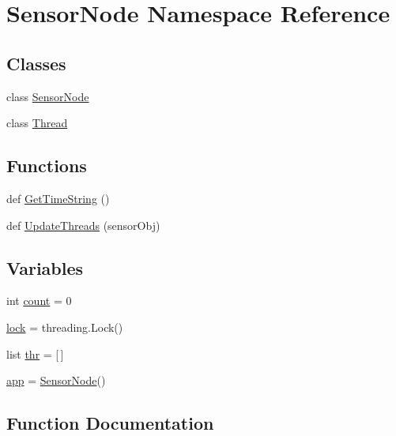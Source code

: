 \hypertarget{namespaceSensorNode}{}\section{Sensor\+Node Namespace Reference}
\label{namespaceSensorNode}
\subsection*{Classes}
\begin{DoxyCompactItemize}
\item 
class \hyperlink{classSensorNode_1_1SensorNode}{Sensor\+Node}
\item 
class \hyperlink{classSensorNode_1_1Thread}{Thread}
\end{DoxyCompactItemize}
\subsection*{Functions}
\begin{DoxyCompactItemize}
\item 
def \hyperlink{namespaceSensorNode_a9ef694aa75e06b802a3ad5f0ef476f6f}{Get\+Time\+String} ()
\item 
def \hyperlink{namespaceSensorNode_a12355791e34f3144948a5a6f35a3b2b5}{Update\+Threads} (sensor\+Obj)
\end{DoxyCompactItemize}
\subsection*{Variables}
\begin{DoxyCompactItemize}
\item 
int \hyperlink{namespaceSensorNode_a3016284326d74dfe31b9e2ecfa7fa6df}{count} = 0
\item 
\hyperlink{namespaceSensorNode_a07847a51e8fc73f94d1b5244eabe2926}{lock} = threading.\+Lock()
\item 
list \hyperlink{namespaceSensorNode_a972db98176c0c5ca50407768608addd0}{thr} = \mbox{[}$\,$\mbox{]}
\item 
\hyperlink{namespaceSensorNode_a1c06b14e3f48f507247d5b8e0e910f35}{app} = \hyperlink{classSensorNode_1_1SensorNode}{Sensor\+Node}()
\end{DoxyCompactItemize}


\subsection{Function Documentation}

